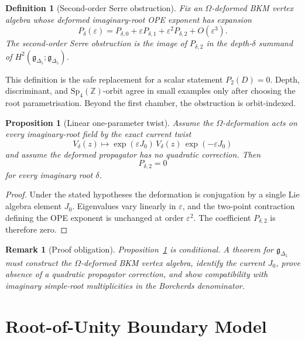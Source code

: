 \documentclass[11pt]{article}
\newtheorem{proposition}[theorem]{Proposition}
\newtheorem{definition}[theorem]{Definition}
\newtheorem{remark}[theorem]{Remark}
\providecommand{\Z}{\mathbb{Z}}
\providecommand{\Sp}{\mathrm{Sp}}
\begin{document}
\begin{definition}[Second-order Serre obstruction]
\label{def:p2-obstruction}
Fix an \(\Omega\)-deformed BKM vertex algebra whose deformed
imaginary-root OPE exponent has expansion
\[
  P_\delta(\varepsilon)
  =
  P_{\delta,0}
  +\varepsilon P_{\delta,1}
  +\varepsilon^2P_{\delta,2}
  +O(\varepsilon^3).
\]
The second-order Serre obstruction is the image of
\(P_{\delta,2}\) in the depth-\(\delta\) summand of
\(H^2(\mathfrak g_{\Delta_5};\mathfrak g_{\Delta_5})\).
\end{definition}

This definition is the safe replacement for a scalar statement
\(P_2(D)=0\).  Depth, discriminant, and \(\Sp_4(\Z)\)-orbit agree in
small examples only after choosing the root parametrisation.  Beyond the
first chamber, the obstruction is orbit-indexed.

\begin{proposition}[Linear one-parameter twist]
\label{prop:linear-twist}
Assume the \(\Omega\)-deformation acts on every imaginary-root field by
the exact current twist
\[
  V_\delta(z)\longmapsto \exp(\varepsilon J_0)\,V_\delta(z)\,
  \exp(-\varepsilon J_0)
\]
and assume the deformed propagator has no quadratic correction.  Then
\[
  P_{\delta,2}=0
\]
for every imaginary root \(\delta\).
\end{proposition}

\begin{proof}
Under the stated hypotheses the deformation is conjugation by a single
Lie algebra element \(J_0\).  Eigenvalues vary linearly in
\(\varepsilon\), and the two-point contraction defining the OPE
exponent is unchanged at order \(\varepsilon^2\).  The coefficient
\(P_{\delta,2}\) is therefore zero.
\end{proof}

\begin{remark}[Proof obligation]
\label{rmk:linear-twist-obligation}
Proposition~\ref{prop:linear-twist} is conditional.  A theorem for
\(\mathfrak g_{\Delta_5}\) must construct the \(\Omega\)-deformed BKM
vertex algebra, identify the current \(J_0\), prove absence of a
quadratic propagator correction, and show compatibility with imaginary
simple-root multiplicities in the Borcherds denominator.
\end{remark}

\section{Root-of-Unity Boundary Model}
\label{sec:root-unity}
\end{document}
